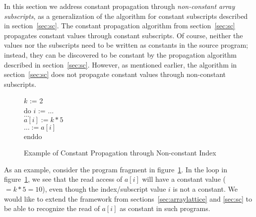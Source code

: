 


In this section we address constant propagation
through {\it non-constant array subscripts}, as a generalization
of the algorithm
for constant subscripts described in section~\ref{sec:sc}.
The constant propagation algorithm from section~\ref{sec:sc} 
propagates
constant values through constant subscripts.  Of course, neither
the values nor the subscripts need to be written as constants in the
source program; instead, they can be discovered to be constant by
the propagation algorithm described in section~\ref{sec:sc}.
However, as mentioned earlier,
the algorithm in section~\ref{sec:sc} does not
propagate constant values through non-constant subscripts.


\begin{figure}[h]
\begin{center}
\parbox{3.0in}{
\begin{programa}
\Ta $k$ := 2 \\
\Ta do $i$ := $\ldots$ \\
\Tb  $\ldots$ \\
\Tb  $a[i] := k * 5$ \\
\Tb  $\ldots := a[i]$ \\
\Ta enddo \\
\end{programa}
}
\end{center}
\caption{Example of Constant Propagation through Non-constant Index}
\label{fig:non-const-ex-source}
\end{figure}

As an example, consider the program fragment in
figure~\ref{fig:non-const-ex-source}.  In the loop in
figure~\ref{fig:non-const-ex-source}, we see that the read access of
$a[i]$ will have a constant value ($=k*5=10$), even though the
index/subscript value $i$ is not a constant.  We would like to extend
the framework from sections~\ref{sec:arraylattice} and \ref{sec:sc} to be
able to recognize the read of $a[i]$ as constant in such programs.

